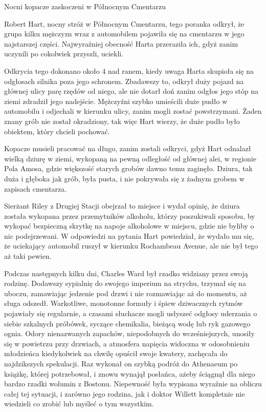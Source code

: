 \begin{displayquote}

Nocni kopacze zaskoczeni w Północnym Cmentarzu

Robert Hart, nocny stróż w Północnym Cmentarzu, tego poranka odkrył, że grupa kilku mężczyzn wraz z automobilem pojawiła się na cmentarzu w jego najstarszej części. Najwyraźniej obecność Harta przeraziła ich, gdyż zanim uczynili po cokolwiek przyszli, uciekli. 

Odkrycia tego dokonano około 4 nad ranem, kiedy uwaga Harta skupioła się na odgłosach silnika poza jego schronem. Zbadawszy to, odkrył duży pojazd na głównej ulicy parę rzędów od niego, ale nie dotarł doń zanim odgłos jego stóp na ziemi zdradził jego nadejście. Mężczyźni szybko umieścili duże pudło w automobilu i odjechali w kierunku ulicy, zanim mogli zostać powstrzymani. Żaden znany grób nie został okradziony, tak więc Hart wierzy, że duże pudło było obiektem, który chcieli pochować. 

Kopacze musieli pracować na długo, zanim zostali odkryci, gdyż Hart odnalazł wielką dziurę w ziemi, wykopaną na pewną odległość od głównej alei, w regionie Pola Amosa, gdzie większość starych grobów dawno temu zaginęło. Dziura, tak duża i głęboka jak grób, była pusta, i nie pokrywała się z żadnym grobem w zapisach cmentarza. 

Sierżant Riley z Drugiej Stacji obejrzał to miejsce i wydał opinię, że dziura została wykopana przez przemytników alkoholu, którzy poszukiwali sposobu, by wykopać bezpieczną skrytkę na napoje alkoholowe w miejscu, gdzie nie byliby o nic podejrzewani. W odpowiedzi na pytania Hart powiedział, że wydało mu się, że uciekający automobil ruszył w kierunku Rochambeau Avenue, ale nie był tego aż taki pewien. 

\end{displayquote}

Podczas następnych kilku dni, Charles Ward był rzadko widziany przez swoją rodzinę. Dodawszy sypialnię do swojego imperium na strychu, trzymał się na uboczu, zamawiając jedzenie pod drzwi i nie rozmawiając aż do momentu, aż sługa odszedł. Warkotliwe, monotonne formuły i śpiew dziwacznych rytmów pojawiały się regularnie, a czasami słuchacze mogli usłyszeć odgłosy uderzania o siebie szkalnych próbówek, syczące chemikalia, bieżącą wodę lub ryk gazowego ognia. Odory nienazwanych zapachów, niepodobnych do wcześniejszych, unosiły się w powietrzu przy drzwiach, a atmosfera napięcia widoczna w odosobnieniu młodzieńca kiedykolwiek na chwilę opuścił swoje kwatery, zachęcała do najdzikszych spekulacji. Raz wykonał on szybką podróż do Athenaeum po książkę, której potrzebował, i znowu wynajął posłańca, ażeby ściągnął dla niego bardzo rzadki wolumin z Bostonu. Niepewność była wypisana wyraźnie na obliczu całej tej sytuacji, i zarówno jego rodzina, jak i doktor Willett kompletnie nie wiedzieli co zrobić lub myśleć o tym wszystkim.

